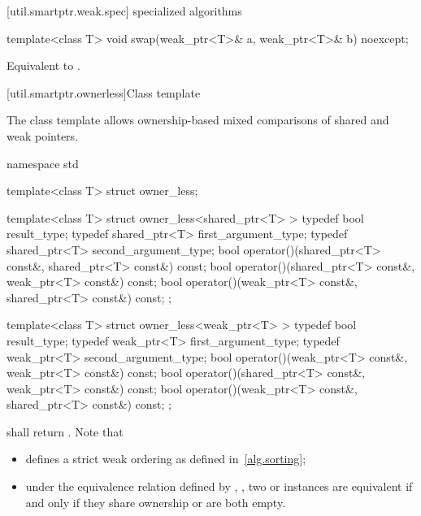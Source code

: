 [util.smartptr.weak.spec]{ specialized algorithms}

%
%
\begin{itemdecl}
template<class T> void swap(weak_ptr<T>& a, weak_ptr<T>& b) noexcept;
\end{itemdecl}

\begin{itemdescr}
\pnum\effects  Equivalent to .
\end{itemdescr}

[util.smartptr.ownerless]{Class template }

\pnum
The class template  allows ownership-based mixed comparisons of shared
and weak pointers.

\begin{codeblock}
namespace std {
  template<class T> struct owner_less;

  template<class T> struct owner_less<shared_ptr<T> > {
    typedef bool result_type;
    typedef shared_ptr<T> first_argument_type;
    typedef shared_ptr<T> second_argument_type;
    bool operator()(shared_ptr<T> const&, shared_ptr<T> const&) const;
    bool operator()(shared_ptr<T> const&, weak_ptr<T> const&) const;
    bool operator()(weak_ptr<T> const&, shared_ptr<T> const&) const;
  };

  template<class T> struct owner_less<weak_ptr<T> > {
    typedef bool result_type;
    typedef weak_ptr<T> first_argument_type;
    typedef weak_ptr<T> second_argument_type;
    bool operator()(weak_ptr<T> const&, weak_ptr<T> const&) const;
    bool operator()(shared_ptr<T> const&, weak_ptr<T> const&) const;
    bool operator()(weak_ptr<T> const&, shared_ptr<T> const&) const;
  };
}
\end{codeblock}

\pnum {} shall return . \enternote
Note that

\begin{itemize}
\item {} defines a strict weak ordering as defined in~\ref{alg.sorting};

\item under the equivalence relation defined by ,
, two  or
 instances are equivalent if and only if they share ownership or are
both empty.
\end{itemize} \exitnote

